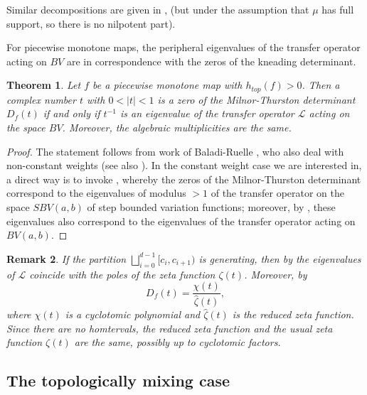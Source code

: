 \documentclass[11pt]{amsart}
\newtheorem{theorem}{Theorem}[section]
\newtheorem{remark}[theorem]{Remark}
\begin{document}
Similar decompositions are given in \cite{Ry}, \cite{HK} (but under the assumption that $\mu$ has full support, so there is no nilpotent part). 

For piecewise monotone maps, the peripheral eigenvalues of the transfer operator acting on $BV$ are in correspondence 
with the zeros of the kneading determinant. 

\begin{theorem} \label{T:eigen-knead}
Let $f$ be a piecewise monotone map with $h_{top}(f) > 0$. Then a complex number $t$ with 
$0 < |t| < 1$  
is a zero of the Milnor-Thurston determinant $D_f(t)$ if and only if $t^{-1}$ is an eigenvalue of the 
transfer operator $\mathcal{L}$ acting on the space $BV$. 
Moreover, the algebraic multiplicities are the same.
\end{theorem}

\begin{proof}
The statement follows from work of Baladi-Ruelle \cite{Baladi-Ruelle}, who also deal with non-constant weights (see also \cite{Baladi-notes}). 
In the constant weight case we are interested in, a direct way is to invoke \cite[Theorem 3.1]{Rugh}, whereby the zeros of the Milnor-Thurston determinant correspond to the eigenvalues of modulus $> 1$ of the transfer operator on the space $SBV(a,b)$ of step bounded variation functions; moreover, by \cite[Theorem 3.3]{Rugh}, these eigenvalues also correspond to the eigenvalues of the transfer operator acting on $BV(a, b)$. 
\end{proof}

\begin{remark}
If the partition $\bigsqcup_{i = 0}^{d-1} [c_i, c_{i+1})$ is generating, then by \cite[Theorem 2]{Baladi-Keller} the eigenvalues of $\mathcal{L}$ 
coincide with the poles of the zeta function $\zeta(t)$. Moreover, by \cite[Theorem 9.2]{MT}
$$D_f(t) = \frac{\chi(t)}{\widehat{\zeta}(t)},$$ 
where $\chi(t)$ is a cyclotomic polynomial and $\widehat{\zeta}(t)$ is the \emph{reduced} zeta function. 
Since there are no homtervals, the reduced zeta function and the usual zeta function $\zeta(t)$ are the same, possibly up to 
cyclotomic factors.
\end{remark} 


\subsection{The topologically mixing case}
\end{document}
